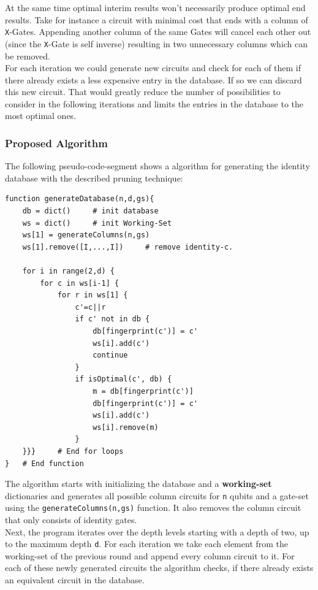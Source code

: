At the same time optimal interim results won't necessarily produce optimal end results. Take for instance a circuit with minimal cost that ends with a column of \texttt{X}-Gates. Appending another column of the same Gates will cancel each other out (since the \texttt{X}-Gate is self inverse) resulting in two unnecessary columns which can be removed.\\

For each iteration we could generate new circuits and check for each of them if there already exists a less expensive entry in the database. If so we can discard this new circuit. That would greatly reduce the number of possibilities to consider in the following iterations and limits the entries in the database to the most optimal ones.

\subsubsection{Proposed Algorithm}

The following pseudo-code-segment shows a algorithm for generating the identity database with the described pruning technique:

\begin{verbatim}
function generateDatabase(n,d,gs){
	db = dict() 	# init database
	ws = dict() 	# init Working-Set
	ws[1] = generateColumns(n,gs)
	ws[1].remove([I,...,I]) 	# remove identity-c.
	
	for i in range(2,d) {
		for c in ws[i-1] {
			for r in ws[1] {
				c'=c||r
				if c' not in db {
					db[fingerprint(c')] = c'
					ws[i].add(c')
					continue
				}
				if isOptimal(c', db) {
					m = db[fingerprint(c')]
					db[fingerprint(c')] = c'	
					ws[i].add(c')
					ws[i].remove(m)
				}
	}}} 	# End for loops
} 	# End function
\end{verbatim}

The algorithm starts with initializing the database and a \textbf{working-set} dictionaries and generates all possible column circuits for \texttt{n} qubits and a gate-set using the \texttt{generateColumns(n,gs)} function. It also removes the column circuit that only consists of identity gates.\\

Next, the program iterates over the depth levels starting with a depth of two, up to the maximum depth \texttt{d}. For each iteration we take each element from the working-set of the previous round and append every column circuit to it. For each of these newly generated circuits the algorithm checks, if there already exists an equivalent circuit in the database. \\

